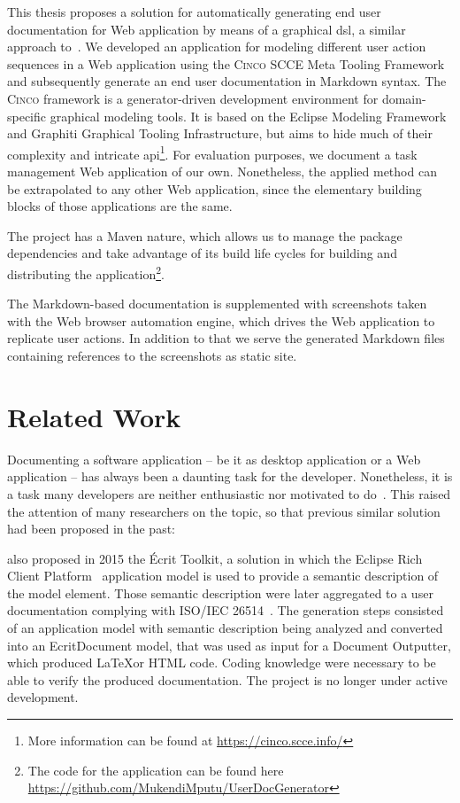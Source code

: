 This thesis proposes a solution for automatically generating end user documentation for Web application by means of a graphical \gls*{dsl}, a similar approach to~\cite{bosselmann-et_al}. We developed an application for modeling different user action sequences in a Web application using the \textsc{Cinco} SCCE Meta Tooling Framework~\cite{Cinco} and subsequently generate an end user documentation in Markdown syntax. The \textsc{Cinco} framework is a generator-driven development environment for domain-specific graphical modeling tools. It is based on the Eclipse Modeling Framework and Graphiti Graphical Tooling Infrastructure, but aims to hide much of their complexity and intricate \gls{api}\footnote{More information can be found at \url{https://cinco.scce.info/}}. For evaluation purposes, we document a task management Web application of our own. Nonetheless, the applied method can be extrapolated to any other Web application, since the elementary building blocks of those applications are the same.

The project has a Maven nature, which allows us to manage the package dependencies and take advantage of its build life cycles for building and distributing the application\footnote{The code for the application can be found here \url{https://github.com/MukendiMputu/UserDocGenerator}}.

The Markdown-based documentation is supplemented with screenshots taken with the Web browser automation engine, which drives the Web application to replicate user actions. In addition to that we serve the generated Markdown files containing references to the screenshots as static site.

\section{Related Work}\label{sec:relWork}

Documenting a software application -- be it as desktop application or a Web application -- has always been a daunting task for the developer. Nonetheless, it is a task many developers are neither enthusiastic nor motivated to do~\cite{kipyegen2013importance}. This raised the attention of many researchers on the topic, so that previous similar solution had been proposed in the past:

\cite{descher_et-al} also proposed in 2015 the Écrit Toolkit, a solution in which the Eclipse Rich Client Platform~\cite{eclipseRCP} application model is used to provide a semantic description of the model element. Those semantic description were later aggregated to a user documentation complying with ISO/IEC 26514~\cite{descher_et-al}. The generation steps consisted of an application model with semantic description being analyzed and converted into an EcritDocument model, that was used as input for a Document Outputter, which produced \LaTeX or HTML code. Coding knowledge were necessary to be able to verify the produced documentation. The project is no longer under active development.

